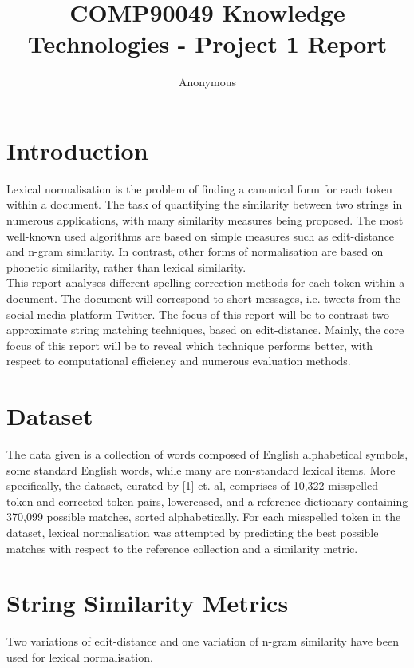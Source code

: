 \documentclass[11pt]{article}
\title{COMP90049 Knowledge Technologies - Project 1 Report}
\author
{Anonymous}
\begin{document}
\maketitle



\section{Introduction}
Lexical normalisation is the problem of finding a canonical form for each token within a document. The task of quantifying the similarity between two strings in numerous applications, with many similarity measures being proposed. The most well-known used algorithms are based on simple measures such as edit-distance and n-gram similarity. In contrast, other forms of normalisation are based on phonetic similarity, rather than lexical similarity.
\\

This report analyses different spelling correction methods for each token within a document. The document will correspond to short messages, i.e. tweets from the social media platform Twitter. The focus of this report will be to contrast two approximate string matching techniques, based on edit-distance. Mainly, the core focus of this report will be to reveal which technique performs better, with respect to computational efficiency and numerous evaluation methods.

\section{Dataset}

The data given is a collection of words composed of English alphabetical symbols, some standard English words, while many are non-standard lexical items.
More specifically, the dataset, curated by [1] et. al, comprises of 10,322 misspelled token and corrected token pairs, lowercased, and a reference dictionary containing 370,099 possible matches, sorted alphabetically. For each misspelled token in the dataset, lexical normalisation was attempted by predicting the best possible matches with respect to the reference collection and a similarity metric.



\section{String Similarity Metrics}
Two variations of edit-distance and one variation of n-gram similarity have been used for lexical normalisation.
\end{document}
